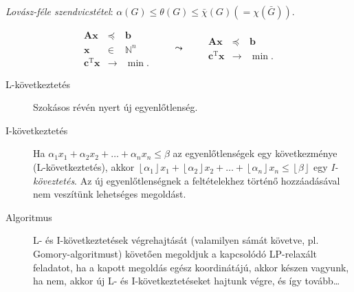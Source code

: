 \documentclass[DIV=15,appendixprefix]{scrreprt}
\theoremstyle{definition}
\theoremstyle{remark}
\DeclareMathOperator{\T}{T}
\begin{document}
\begin{description}
		\emph{Lovász-féle szendvicstétel}: $ \alpha \left( G \right) \le \theta \left( G \right) \le
		\bar{ \chi } \left( G \right) \left( = \chi \left( \bar{ G } \right) \right) $.
\end{description}
%
\begin{equation}\tag{IP és LP-relaxáltja}
	\begin{array}{rcl}
		\mathbf{ A } \mathbf{ x } 			&	\preceq		&	\mathbf{ b }\\
		\mathbf{ x } 						&	\in			&	\mathbb{ N }^{ n }\\
		\hline
		\mathbf{ c }^{ \T } \mathbf{ x }	&	\rightarrow	&	\min.
	\end{array} \qquad \leadsto \qquad \begin{array}{rcl}
		\mathbf{ A } \mathbf{ x } 			&	\preceq		&	\mathbf{ b }\\
		\hline
		\mathbf{ c }^{ \T } \mathbf{ x }	&	\rightarrow	&	\min.
	\end{array}
\end{equation}
\begin{description}
	\item[L-következtetés] Szokásos  révén nyert új egyenlőtlenség.
	\item[I-következtetés] Ha $ \alpha_{ 1 } x_{ 1 } + \alpha_{ 2 } x_{ 2 } + \ldots +
		\alpha_{ n } x_{ n } \le \beta $ az egyenlőtlenségek egy következménye
		(L-következtetés), akkor $ \left\lfloor \alpha_{ 1 } \right\rfloor x_{ 1 } +
		\left\lfloor \alpha_{ 2 } \right\rfloor x_{ 2 } + \ldots + \left\lfloor \alpha_{ n }
		\right\rfloor x_{ n } \le \left\lfloor \beta \right\rfloor $ egy \emph{I-köveztetés}. Az
		új egyenlőtlenségnek a feltételekhez történő hozzáadásával nem veszítünk lehetséges
		megoldást.
	\item[Algoritmus] L- és I-következtetések végrehajtását (valamilyen sámát követve, pl.
		Gomory-al\-go\-rit\-must) követően megoldjuk a kapcsolódó LP-relaxált feladatot, ha a kapott
		megoldás egész koordinátájú, akkor készen vagyunk, ha nem, akkor új L- és
		I-következtetéseket hajtunk végre, és így tovább\ldots
\end{description}
\end{document}
